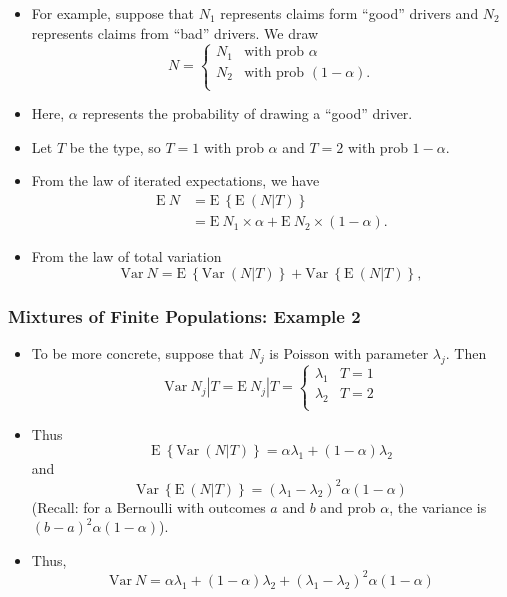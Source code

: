 \documentclass[]{book}
\theoremstyle{definition}
\theoremstyle{definition}
\theoremstyle{definition}
\theoremstyle{remark}
\begin{document}
\begin{itemize}
\item
  For example, suppose that \(N_1\) represents claims form ``good''
  drivers and \(N_2\) represents claims from ``bad'' drivers. We draw
  \[N =
  \begin{cases}
  N_1  &  \text{with prob~}\alpha\\
  N_2  &   \text{with prob~}(1-\alpha) .\\
  \end{cases}\]
\item
  Here, \(\alpha\) represents the probability of drawing a ``good''
  driver.
\item
  Let \(T\) be the type, so \(T=1\) with prob \(\alpha\) and \(T=2\)
  with prob \(1-\alpha\).
\item
  From the law of iterated expectations, we have \[\begin{aligned}
  \mathrm{E~} N &= \mathrm{E~} \left\{ \mathrm{E~} \left( N | T \right) \right \} \\
   &= \mathrm{E~} N_1 \times \alpha +  \mathrm{E~} N_2 \times (1-\alpha).\end{aligned}\]
\item
  From the law of total variation
  \[\mathrm{Var~} N= \mathrm{E~} \left\{ \mathrm{Var~} \left( N | T \right) \right \}
  +\mathrm{Var~} \left\{ \mathrm{E~} \left( N | T \right) \right \},\]
\end{itemize}

\subsubsection{Mixtures of Finite Populations: Example
2}\label{mixtures-of-finite-populations-example-2}

\begin{itemize}
\item
  To be more concrete, suppose that \(N_j\) is Poisson with parameter
  \(\lambda_j\). Then \[\mathrm{Var~} N_j|T= \mathrm{E~} N_j|T =
  \begin{cases}
  \lambda_1  &  T=1\\
  \lambda_2  &  T=2\\
  \end{cases}\]
\item
  Thus
  \[\mathrm{E~} \left\{ \mathrm{Var~} \left( N | T \right) \right \} = \alpha \lambda_1+ (1-\alpha) \lambda_2\]
  and
  \[\mathrm{Var~} \left\{ \mathrm{E~} \left( N | T \right) \right \} = (\lambda_1-\lambda_2)^2 \alpha (1-\alpha)\]
  (Recall: for a Bernoulli with outcomes \(a\) and \(b\) and prob
  \(\alpha\), the variance is \((b-a)^2\alpha(1-\alpha)\)).
\item
  Thus,
  \[\mathrm{Var~} N= \alpha \lambda_1+ (1-\alpha) \lambda_2 + (\lambda_1-\lambda_2)^2 \alpha (1-\alpha)\]
\end{itemize}
\end{document}
